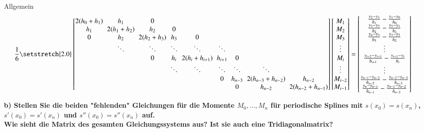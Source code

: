 \documentclass[10pt,a4paper]{article}
\begin{document}
		Allgemein
		\begin{align*}
		\frac{1}{6} 
		\begingroup %
		\setlength\arraycolsep{3pt}
		\setstretch{2.0}
		\begin{bmatrix}
			2(h_0+h_1) & h_1        & 0          &        &                &         &         &                    &  \\
			h_1        & 2(h_1+h_2) & h_2        & 0      &                &         &         &                    &  \\
			0          & h_2        & 2(h_2+h_3) & h_3    & 0              &         &         &                    &  \\
			           & \ddots     & \ddots     & \ddots & \ddots         & \ddots  &         &                    &  \\
			           &            & 0          & h_i    & 2(h_i+h_{i+1}) & h_{i+1} & 0       &                    &  \\
			           &            &            & \ddots & \ddots         & \ddots  & \ddots  & \ddots             &  \\
			           &            &            &        &                & 0       & h_{n-3} & 2(h_{n-3}+h_{n-2}) & h_{n-2}            \\
			           &            &            &        &                &         & 0       & h_{n-2}            & 2(h_{n-2}+h_{n-1})
		\end{bmatrix}
		\endgroup
		\begin{bmatrix}
			M_1     \\
			M_2     \\
			M_3     \\
			\vdots  \\
			M_i     \\
			\vdots  \\
			M_{i-2} \\
			M_{i-1}
		\end{bmatrix}
		=
		\begin{bmatrix}
			\frac{y_{2}-y_{1}}{h_{1}}-\frac{y_{1}-y_{0}}{h_0}           \\
			\frac{y_{3}-y_{2}}{h_{2}}-\frac{y_{2}-y_{1}}{h_1}           \\
			\frac{y_{4}-y_{3}}{h_{3}}-\frac{y_{3}-y_{2}}{h_2}           \\
			\vdots \\
			\frac{y_{i+2}-y_{i+1}}{h_{i+1}}-\frac{y_{i+1}-y_i}{h_i}     \\
			\vdots \\
			\frac{y_{n-1}-y_{n-2}}{h_{n-2}}-\frac{y_{n-2}-y_{n-3}}{h_{n-3}}   \\
			\frac{y_{n}-y_{n-1}}{h_{n-1}}-\frac{y_{n-1}-y_{n-2}}{h_{n-2}}
		\end{bmatrix}
		\end{align*}			
			
	\textbf{%
		b) Stellen Sie die beiden "fehlenden" Gleichungen für die Momente $M_0, \dots, M_n$ für periodische Splines mit $s(x_0) = s(x_n)$, $s′(x_0) = s′(x_n)$ und $s''(x_0)=s''(x_n)$ auf. \\
		Wie sieht die Matrix des gesamten Gleichungssystems aus? Ist sie auch eine Tridiagonalmatrix?
	}
\end{document}
